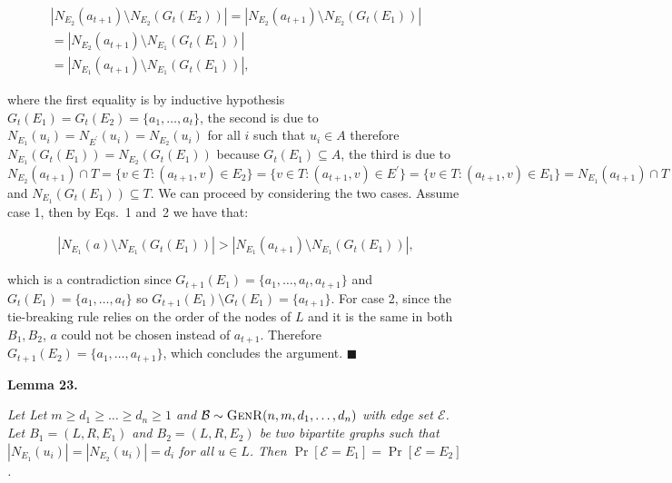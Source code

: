 \[\begin{gathered}
\displaystyle|N_{E_{2}}(a_{t+1})\setminus N_{E_{2}}(G_{t}(E_{2}))| \displaystyle=|N_{E_{2}}(a_{t+1})\setminus N_{E_{2}}(G_{t}(E_{1}))| \\
\displaystyle=|N_{E_{2}}(a_{t+1})\setminus N_{E_{1}}(G_{t}(E_{1}))| \\
\displaystyle=|N_{E_{1}}(a_{t+1})\setminus N_{E_{1}}(G_{t}(E_{1}))|,
\end{gathered}\]


where the first equality is by inductive hypothesis $G_{t}(E_{1})=G_{t}(E_{2})=\{a_{1},\dots,a_{t}\}$, the second is due to $N_{E_{1}}(u_{i})=N_{E^{\prime}}(u_{i})=N_{E_{2}}(u_{i})$ for all $i$ such that $u_{i}\in A$ therefore $N_{E_{1}}(G_{t}(E_{1}))=N_{E_{2}}(G_{t}(E_{1}))$ because $G_{t}(E_{1})\subseteq A$, the third is due to $N_{E_{2}}(a_{t+1})\cap T=\{v\in T:(a_{t+1},v)\in E_{2}\}=\{v\in T:(a_{t+1},v)\in E^{\prime}\}=\{v\in T:(a_{t+1},v)\in E_{1}\}=N_{E_{1}}(a_{t+1})\cap T$ and $N_{E_{1}}(G_{t}(E_{1}))\subseteq T$.
We can proceed by considering the two cases.
Assume case 1, then by Eqs. 1 and 2 we have that:\par


\[\begin{gathered}
\displaystyle|N_{E_{1}}(a)\setminus N_{E_{1}}(G_{t}(E_{1}))|>|N_{E_{1}}(a_{t+1})\setminus N_{E_{1}}(G_{t}(E_{1}))|,
\end{gathered}\]


which is a contradiction since $G_{t+1}(E_{1})=\{a_{1},\dots,a_{t},a_{t+1}\}$ and $G_{t}(E_{1})=\{a_{1},\dots,a_{t}\}$ so $G_{t+1}(E_{1})\setminus G_{t}(E_{1})=\{a_{t+1}\}$.
For case 2, since the tie-breaking rule relies on the order of the nodes of $L$ and it is the same in both $B_{1},B_{2}$, $a$ could not be chosen instead of $a_{t+1}$.
Therefore $G_{t+1}(E_{2})=\{a_{1},\dots,a_{t+1}\}$, which concludes the argument.
\ensuremath{\blacksquare}\par






\par\medskip\noindent\textbf{\textbf{Lemma 23}\textbf{.}}\par



\emph{Let Let $m\geq d_{1}\geq\dots\geq d_{n}\geq 1$ and $\mathcal{B}\sim\textsc{GenR}(n,m,d_{1},\dots,d_{n})$ with edge set $\mathcal{E}$.
Let $B_{1}=(L,R,E_{1})$ and $B_{2}=(L,R,E_{2})$ be two bipartite graphs such that
$|N_{E_{1}}(u_{i})|=|N_{E_{2}}(u_{i})|=d_{i}$ for all $u\in L$.
Then $\Pr[\mathcal{E}=E_{1}]=\Pr[\mathcal{E}=E_{2}]$.}\par



